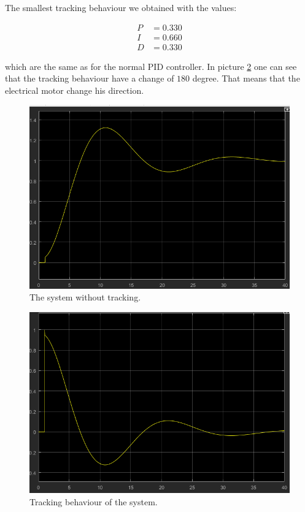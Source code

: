 The smallest tracking behaviour we obtained with the values:

\begin{align*}
    P &= 0.330 \\
    I &= 0.660 \\
    D &= 0.330
\end{align*}

which  are  the  same  as  for  the  normal   PID   controller.   In   picture
\ref{fig:tracking}  one  can  see  that the tracking behaviour have a change of
$180$  degree.  That means that the electrical  motor  change  his  direction.

\begin{figure}[t]
    \centering
    \includegraphics[width=\imagewidth]{images/slope.png}
    \caption{The system without tracking.}
    \label{fig:WithoutTracking}
\end{figure}

\begin{figure}[t]
    \centering
    \includegraphics[width=\imagewidth]{images/slope_tracking.png}
    \caption{Tracking behaviour of the system.}
    \label{fig:tracking}
\end{figure}

